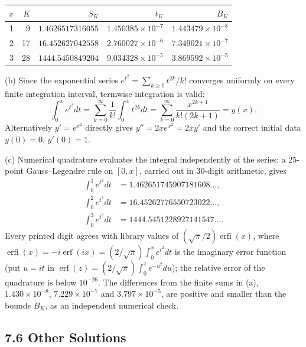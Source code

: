 \begin{center}\small
\begin{tabular}{rrrrr}\toprule
$x$&$K$&$S_K$&$t_K$&$B_K$\\\midrule
1&9&$1.4626517316055$&$1.450385\times10^{-7}$&$1.443479\times10^{-8}$\\
2&17&$16.452627042558$&$2.760027\times10^{-6}$&$7.349021\times10^{-7}$\\
3&28&$1444.5450849204$&$9.034328\times10^{-5}$&$3.869592\times10^{-5}$\\
\bottomrule\end{tabular}\end{center}

(b)  Since the exponential series
$e^{t^2}=\sum_{k\ge0}t^{2k}/k!$ converges uniformly
on every finite integration interval, termwise integration is valid:
\[
\int_0^xe^{t^2}dt
=\sum_{k=0}^\infty\frac1{k!}\int_0^xt^{2k}dt
=\sum_{k=0}^\infty\frac{x^{2k+1}}{k!(2k+1)}=y(x).
\]
Alternatively $y'=e^{x^2}$ directly gives $y''=2xe^{x^2}=2xy'$ and the
correct initial data $y(0)=0$, $y'(0)=1$.

(c) Numerical quadrature evaluates the integral independently of the
series: a 25-point Gauss--Legendre rule on $[0,x]$, carried out in
30-digit arithmetic, gives
\[
\begin{aligned}
\int_0^1e^{t^2}dt&=1.462651745907181608\ldots,\\
\int_0^2e^{t^2}dt&=16.45262776550723022\ldots,\\
\int_0^3e^{t^2}dt&=1444.5451228927141547\ldots.
\end{aligned}
\]
Every printed digit agrees with library values of
$(\sqrt\pi/2)\operatorname{erfi}(x)$, where
$\operatorname{erfi}(x)=-i\operatorname{erf}(ix)=(2/\sqrt\pi)\int_0^xe^{t^2}dt$
is the imaginary error function (put $u=it$ in
$\operatorname{erf}(z)=(2/\sqrt\pi)\int_0^ze^{-u^2}du$); the relative
error of the quadrature is below $10^{-26}$.
The differences from the finite sums in (a), $1.430\times10^{-8}$,
$7.229\times10^{-7}$ and $3.797\times10^{-5}$, are positive and smaller
than the bounds $B_K$, as an independent numerical check.

\subsection*{7.6 Other Solutions}

